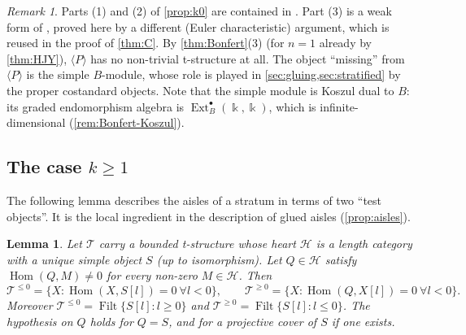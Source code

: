 \documentclass[11pt,reqno]{amsart}
\theoremstyle{plain}
\newtheorem{lemma}[theorem]{Lemma}
\theoremstyle{definition}
\theoremstyle{remark}
\newtheorem{remark}[theorem]{Remark}
\newcommand{\kk}{\Bbbk}
\DeclareMathOperator{\Hom}{Hom}
\DeclareMathOperator{\Ext}{Ext}
\DeclareMathOperator{\Filt}{Filt}
\newcommand{\thick}[1]{\langle #1\rangle}
\newcommand{\cH}{\mathcal{H}}
\newcommand{\cT}{\mathcal{T}}
\begin{document}
\begin{remark}\label{rem:k0}
Parts (1) and (2) of \cref{prop:k0} are contained in \cite[Prop.~2.4 and \S3.2]{Bonf26}. Part (3) is a weak form of \cite[Cor.~3.10]{Bonf26}, proved here by a different (Euler characteristic) argument, which is reused in the proof of \cref{thm:C}. By \cref{thm:Bonfert}(3) (for $n=1$ already by \cref{thm:HJY}), $\thick P$ has no non-trivial t-structure at all. The object ``missing'' from $\thick P$ is the simple $B$-module, whose role is played in \cref{sec:gluing,sec:stratified} by the proper costandard objects. Note that the simple module is Koszul dual to $B$: its graded endomorphism algebra is $\Ext^\bullet_B(\kk,\kk)$, which is infinite-dimensional (\cref{rem:Bonfert-Koszul}).
\end{remark}

\subsection{The case \texorpdfstring{$k\ge1$}{k>=1}}

The following lemma describes the aisles of a stratum in terms of two ``test objects''. It is the local ingredient in the description of glued aisles (\cref{prop:aisles}).

\begin{lemma}\label{lem:aisles}
Let $\cT$ carry a bounded t-structure whose heart $\cH$ is a length category with a unique simple object $S$ (up to isomorphism). Let $Q\in\cH$ satisfy $\Hom(Q,M)\ne0$ for every non-zero $M\in\cH$. Then
\[\cT^{\le0}=\{X:\Hom(X,S[l])=0\ \forall l<0\},\qquad\cT^{\ge0}=\{X:\Hom(Q,X[l])=0\ \forall l<0\}.\]
Moreover $\cT^{\le0}=\Filt\{S[l]:l\ge0\}$ and $\cT^{\ge0}=\Filt\{S[l]:l\le0\}$. The hypothesis on $Q$ holds for $Q=S$, and for a projective cover of $S$ if one exists.
\end{lemma}
\end{document}
